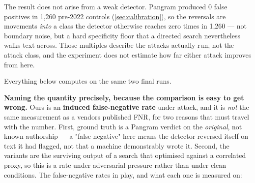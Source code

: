 The result does not arise from a weak detector. Pangram produced 0 false positives in 1,260 pre-2022 controls (\cref{sec:calibration}), so the reversals are movements \emph{into} a class the detector otherwise reaches zero times in 1,260 --- not boundary noise, but a hard specificity floor that a directed search nevertheless walks text across. Those multiples describe the attacks actually run, not the attack class, and the experiment does not estimate how far either attack improves from here.

Everything below computes on the same two final runs.

\textbf{Naming the quantity precisely, because the comparison is easy to get wrong.}
Ours is an \textbf{induced false-negative rate} under attack, and it is \emph{not} the
same measurement as a vendor\textquotesingle s published FNR, for two reasons that must travel
with the number. First, ground truth is a Pangram verdict on the \emph{original},
not known authorship --- a "false negative" here means the detector reversed
itself on text it had flagged, not that a machine demonstrably wrote it.
Second, the variants are the surviving output of a search that optimised
against a correlated proxy, so this is a rate under adversarial pressure
rather than under clean conditions.
The false-negative rates in play, and what each one is measured on:

